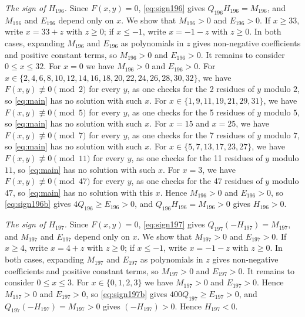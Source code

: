 \documentclass[11pt]{article}
\begin{document}
\emph{The sign of $H_{196}$.} Since $F(x,y)=0$, \eqref{eq:sign196} gives $Q_{196}H_{196}=M_{196}$, and $M_{196}$ and $E_{196}$ depend only on $x$. We show that $M_{196}>0$ and $E_{196}>0$. If $x\geq33$, write $x=33+z$ with $z\geq0$; if $x\leq-1$, write $x=-1-z$ with $z\geq0$. In both cases, expanding $M_{196}$ and $E_{196}$ as polynomials in $z$ gives non-negative coefficients and positive constant terms, so $M_{196}>0$ and $E_{196}>0$. It remains to consider $0\leq x\leq32$. For $x=0$ we have $M_{196}>0$ and $E_{196}>0$. For $x\in\{2,\allowbreak 4,\allowbreak 6,\allowbreak 8,\allowbreak 10,\allowbreak 12,\allowbreak 14,\allowbreak 16,\allowbreak 18,\allowbreak 20,\allowbreak 22,\allowbreak 24,\allowbreak 26,\allowbreak 28,\allowbreak 30,\allowbreak 32\}$, we have $F(x,y)\not\equiv0\pmod{2}$ for every $y$, as one checks for the 2 residues of $y$ modulo $2$, so \eqref{eq:main} has no solution with such $x$. For $x\in\{1,\allowbreak 9,\allowbreak 11,\allowbreak 19,\allowbreak 21,\allowbreak 29,\allowbreak 31\}$, we have $F(x,y)\not\equiv0\pmod{5}$ for every $y$, as one checks for the 5 residues of $y$ modulo $5$, so \eqref{eq:main} has no solution with such $x$. For $x=15$ and $x=25$, we have $F(x,y)\not\equiv0\pmod{7}$ for every $y$, as one checks for the 7 residues of $y$ modulo $7$, so \eqref{eq:main} has no solution with such $x$. For $x\in\{5,\allowbreak 7,\allowbreak 13,\allowbreak 17,\allowbreak 23,\allowbreak 27\}$, we have $F(x,y)\not\equiv0\pmod{11}$ for every $y$, as one checks for the 11 residues of $y$ modulo $11$, so \eqref{eq:main} has no solution with such $x$. For $x=3$, we have $F(x,y)\not\equiv0\pmod{47}$ for every $y$, as one checks for the 47 residues of $y$ modulo $47$, so \eqref{eq:main} has no solution with this $x$. Hence $M_{196}>0$ and $E_{196}>0$, so \eqref{eq:sign196b} gives $4Q_{196}\geq E_{196}>0$, and $Q_{196}H_{196}=M_{196}>0$ gives $H_{196}>0$.

\emph{The sign of $H_{197}$.} Since $F(x,y)=0$, \eqref{eq:sign197} gives $Q_{197}(-H_{197})=M_{197}$, and $M_{197}$ and $E_{197}$ depend only on $x$. We show that $M_{197}>0$ and $E_{197}>0$. If $x\geq4$, write $x=4+z$ with $z\geq0$; if $x\leq-1$, write $x=-1-z$ with $z\geq0$. In both cases, expanding $M_{197}$ and $E_{197}$ as polynomials in $z$ gives non-negative coefficients and positive constant terms, so $M_{197}>0$ and $E_{197}>0$. It remains to consider $0\leq x\leq3$. For $x\in\{0,\allowbreak 1,\allowbreak 2,\allowbreak 3\}$ we have $M_{197}>0$ and $E_{197}>0$. Hence $M_{197}>0$ and $E_{197}>0$, so \eqref{eq:sign197b} gives $400Q_{197}\geq E_{197}>0$, and $Q_{197}(-H_{197})=M_{197}>0$ gives $(-H_{197})>0$. Hence $H_{197}<0$.
\end{document}
